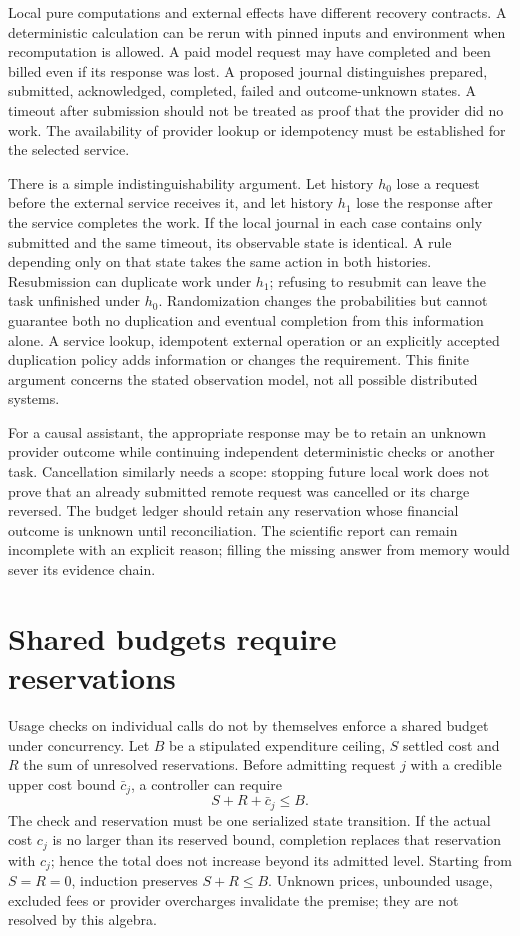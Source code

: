 Local pure computations and external effects have different recovery
contracts. A deterministic calculation can be rerun with pinned inputs and
environment when recomputation is allowed. A paid model request may have
completed and been billed even if its response was lost. A proposed journal
distinguishes prepared, submitted, acknowledged, completed, failed and
outcome-unknown states. A timeout after submission should not be treated as
proof that the provider did no work. The availability of provider lookup or
idempotency must be established for the selected service.
\citep{exec14_l6_design}

There is a simple indistinguishability argument. Let history $h_0$ lose a
request before the external service receives it, and let history $h_1$
lose the response after the service completes the work. If the local
journal in each case contains only submitted and the same timeout, its
observable state is identical. A rule depending only on that state takes
the same action in both histories. Resubmission can duplicate work under
$h_1$; refusing to resubmit can leave the task unfinished under $h_0$.
Randomization changes the probabilities but cannot guarantee both no
duplication and eventual completion from this information alone. A service
lookup, idempotent external operation or an explicitly accepted duplication
policy adds information or changes the requirement. This finite argument
concerns the stated observation model, not all possible distributed
systems. \citep{exec14_l6_exact}

For a causal assistant, the appropriate response may be to retain an
unknown provider outcome while continuing independent deterministic checks
or another task. Cancellation similarly needs a scope: stopping future
local work does not prove that an already submitted remote request was
cancelled or its charge reversed. The budget ledger should retain any
reservation whose financial outcome is unknown until reconciliation. The
scientific report can remain incomplete with an explicit reason; filling
the missing answer from memory would sever its evidence chain.

\section{Shared budgets require reservations}

Usage checks on individual calls do not by themselves enforce a shared
budget under concurrency. Let $B$ be a stipulated expenditure ceiling,
$S$ settled cost and $R$ the sum of unresolved reservations. Before admitting
request $j$ with a credible upper cost bound $\bar c_j$, a controller can
require
\begin{equation}
 S+R+\bar c_j\le B.
 \label{exec14:l6-reserve}
\end{equation}
The check and reservation must be one serialized state transition. If the
actual cost $c_j$ is no larger than its reserved bound, completion replaces
that reservation with $c_j$; hence the total does not increase beyond its
admitted level. Starting from $S=R=0$, induction preserves $S+R\le B$.
Unknown prices, unbounded usage, excluded fees or provider overcharges
invalidate the premise; they are not resolved by this algebra.
\citep{exec14_l6_exact}

